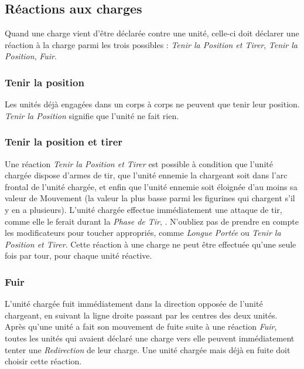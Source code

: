 \subsection{Réactions aux charges}

Quand une charge vient d'être déclarée contre une unité, celle-ci doit déclarer une réaction à la charge parmi les trois possibles : \emph{Tenir la Position et Tirer}, \emph{Tenir la Position}, \emph{Fuir}.

\subsubsection*{Tenir la position}

Les unités déjà engagées dans un corps à corps ne peuvent que tenir leur position. \emph{Tenir la Position} signifie que l'unité ne fait rien.

\subsubsection*{Tenir la position et tirer}

Une réaction \emph{Tenir la Position et Tirer} est possible à condition que l'unité chargée dispose d'armes de tir, que l'unité ennemie la chargeant soit dans l'arc frontal de l'unité chargée, et enfin que l'unité ennemie soit éloignée d'au moins sa valeur de Mouvement (la valeur la plus basse parmi les figurines qui chargent s'il y en a plusieurs). L'unité chargée effectue immédiatement une attaque de tir, comme elle le ferait durant la \emph{Phase de Tir}, . N'oubliez pas de prendre en compte les modificateurs pour toucher appropriés, comme \emph{Longue Portée} ou \emph{Tenir la Position et Tirer}. Cette réaction à une charge ne peut être effectuée qu'une seule fois par tour, pour chaque unité réactive.

\subsubsection*{Fuir}

L'unité chargée fuit immédiatement dans la direction opposée de l'unité chargeant, en suivant la ligne droite passant par les centres des deux unités. Après qu'une unité a fait son mouvement de fuite suite à une réaction \emph{Fuir}, toutes les unités qui avaient déclaré une charge vers elle peuvent immédiatement tenter une \emph{Redirection} de leur charge. Une unité chargée mais déjà en fuite doit choisir cette réaction.

